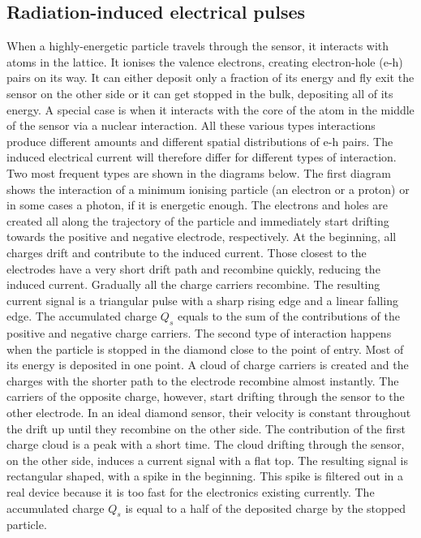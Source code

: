 \documentclass[12pt]{mytustyle}  %
\begin{document}
\subsection{Radiation-induced electrical pulses}
When a highly-energetic particle travels through the sensor, it interacts with atoms in the lattice. It ionises the valence electrons, creating electron-hole (e-h) pairs on its way. It can either deposit only a fraction of its energy and fly exit the sensor on the other side or it can get stopped in the bulk, depositing all of its energy. A special case is when it interacts with the core of the atom in the middle of the sensor via a nuclear interaction. All these various types interactions produce different amounts and different spatial distributions of e-h pairs. The induced electrical current will therefore differ for different types of interaction. Two most frequent types are shown in the diagrams below. The first diagram shows the interaction of a minimum ionising particle (an electron or a proton) or in some cases a photon, if it is energetic enough. The electrons and holes are created all along the trajectory of the particle and immediately start drifting towards the positive and negative electrode, respectively. At the beginning, all charges drift and contribute to the induced current. Those closest to the electrodes have a very short drift path and recombine quickly, reducing the induced current. Gradually all the charge carriers recombine. The resulting current signal is a triangular pulse with a sharp rising edge and a linear falling edge. The accumulated charge $Q_s$ equals to the sum of the contributions of the positive and negative charge carriers. The second type of interaction happens when the particle is stopped in the diamond close to the point of entry. Most of its energy is deposited in one point. A cloud of charge carriers is created and the charges with the shorter path to the electrode recombine almost instantly. The carriers of the opposite charge, however, start drifting through the sensor to the other electrode. In an ideal diamond sensor, their velocity is constant throughout the drift up until they recombine on the other side. The contribution of the first charge cloud is a peak with a short time. The cloud drifting through the sensor, on the other side, induces a current signal with a flat top. The resulting signal is rectangular shaped, with a spike in the beginning. This spike is filtered out in a real device because it is too fast for the electronics existing currently. The accumulated charge $Q_s$ is equal to a half of the deposited charge by the stopped particle.
\end{document}
